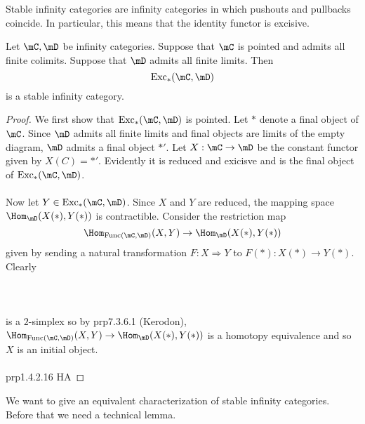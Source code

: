 \documentclass[a4paper]{article}
\begin{document}
Stable infinity categories are infinity categories in which pushouts and pullbacks coincide. In particular, this means that the identity functor is excisive. 

\begin{prp}{}{} Let $\mC,\mD$ be infinity categories. Suppose that $\mC$ is pointed and admits all finite colimits. Suppose that $\mD$ admits all finite limits. Then $$\text{Exc}_\ast(\mC,\mD)$$ is a stable infinity category. \tcbline
\begin{proof}
We first show that $\text{Exc}_\ast(\mC,\mD)$ is pointed. Let $\ast$ denote a final object of $\mC$. Since $\mD$ admits all finite limits and final objects are limits of the empty diagram, $\mD$ admits a final object $\ast'$. Let $X:\mC\to\mD$ be the constant functor given by $X(C)=\ast'$. Evidently it is reduced and exicisve and is the final object of $\text{Exc}_\ast(\mC,\mD)$. \\~\\

Now let $Y\in\text{Exc}_\ast(\mC,\mD)$. Since $X$ and $Y$ are reduced, the mapping space $\Hom_\mD(X(\ast),Y(\ast))$ is contractible. Consider the restriction map $$\Hom_{\text{Func}(\mC,\mD)}(X,Y)\to\Hom_\mD(X(\ast),Y(\ast))$$ given by sending a natural transformation $F:X\Rightarrow Y$ to $F(\ast):X(\ast)\to Y(\ast)$. Clearly \\~\\
\\~\\
is a $2$-simplex so by prp7.3.6.1 (Kerodon), $\Hom_{\text{Func}(\mC,\mD)}(X,Y)\to\Hom_\mD(X(\ast),Y(\ast))$ is a homotopy equivalence and so $X$ is an initial object. \\~\\

prp1.4.2.16 HA
\end{proof}
\end{prp}

We want to give an equivalent characterization of stable infinity categories. Before that we need a technical lemma. 
\end{document}
